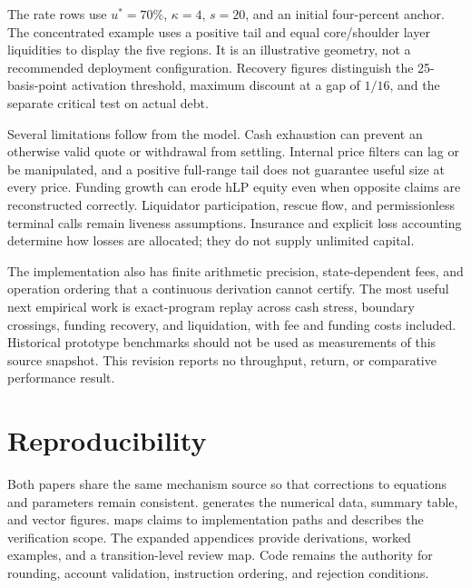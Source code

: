 

The rate rows use $u^*=70\%$, $\kappa=4$, $s=20$, and an initial four-percent anchor. The concentrated example uses a positive tail and equal core/shoulder layer liquidities to display the five regions. It is an illustrative geometry, not a recommended deployment configuration. Recovery figures distinguish the 25-basis-point activation threshold, maximum discount at a gap of $1/16$, and the separate critical test on actual debt.



Several limitations follow from the model. Cash exhaustion can prevent an otherwise valid quote or withdrawal from settling. Internal price filters can lag or be manipulated, and a positive full-range tail does not guarantee useful size at every price. Funding growth can erode hLP equity even when opposite claims are reconstructed correctly. Liquidator participation, rescue flow, and permissionless terminal calls remain liveness assumptions. Insurance and explicit loss accounting determine how losses are allocated; they do not supply unlimited capital.

The implementation also has finite arithmetic precision, state-dependent fees, and operation ordering that a continuous derivation cannot certify. The most useful next empirical work is exact-program replay across cash stress, boundary crossings, funding recovery, and liquidation, with fee and funding costs included. Historical prototype benchmarks should not be used as measurements of this source snapshot. This revision reports no throughput, return, or comparative performance result.

\section*{Reproducibility}

Both papers share the same mechanism source so that corrections to equations and parameters remain consistent.  generates the numerical data, summary table, and vector figures.  maps claims to implementation paths and describes the verification scope. The expanded appendices provide derivations, worked examples, and a transition-level review map. Code remains the authority for rounding, account validation, instruction ordering, and rejection conditions.

